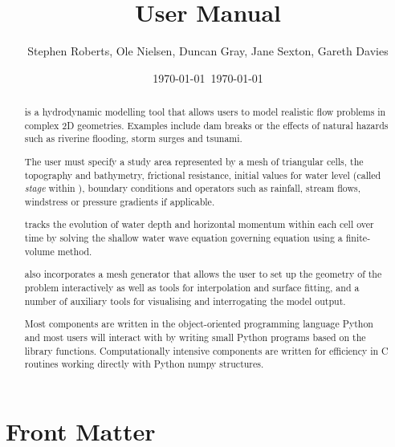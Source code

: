 \documentclass{manual}
\title{\anuga User Manual}
\author{Stephen Roberts, Ole Nielsen, Duncan Gray, Jane Sexton, Gareth Davies}
\date{\today \ \currenttime}
\date{\today} %
\begin{document}
\maketitle

\ifhtml
  \chapter*{Front Matter\label{front}}
\fi

%



\begin{abstract}
\label{def:anuga}

\noindent \anuga\index{\anuga} is a hydrodynamic modelling tool that
allows users to model realistic flow problems in complex 2D geometries.
Examples include dam breaks or the effects of natural hazards such
as riverine flooding, storm surges and tsunami.

The user must specify a study area represented by a mesh of triangular
cells, the topography and bathymetry, frictional resistance, initial
values for water level (called \emph{stage} within \anuga),
boundary conditions and operators such as rainfall,
stream flows, windstress or pressure gradients if applicable.

\anuga tracks the evolution of water depth and horizontal momentum
within each cell over time by solving the shallow water wave equation
governing equation using a finite-volume method.

\anuga also incorporates a mesh generator that
allows the user to set up the geometry of the problem interactively as
well as tools for interpolation and surface fitting, and a number of
auxiliary tools for visualising and interrogating the model output.

Most \anuga components are written in the object-oriented programming
language Python and most users will interact with \anuga by writing
small Python programs based on the \anuga library
functions. Computationally intensive components are written for
efficiency in C routines working directly with Python numpy structures.

\end{abstract}

\tableofcontents
\end{document}
